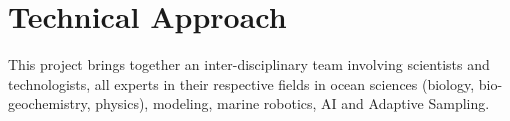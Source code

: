\section{Technical Approach}


This project brings together an inter-disciplinary team involving
scientists and technologists, all experts in their respective fields
in ocean sciences (biology, bio-geochemistry, physics), modeling,
marine robotics, AI and Adaptive Sampling.





